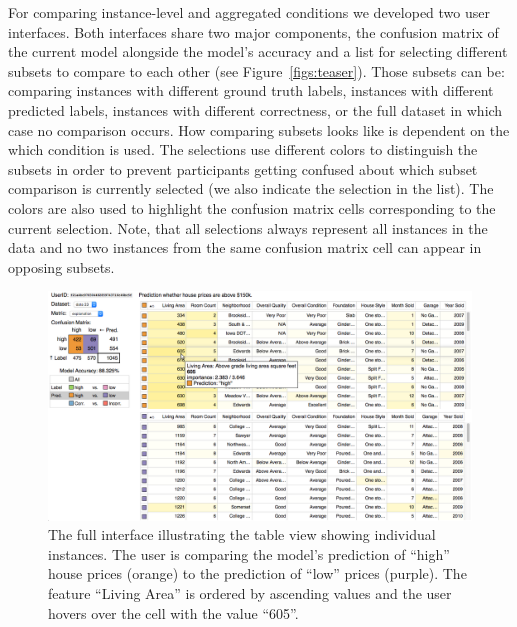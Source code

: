 For comparing instance-level and aggregated conditions we developed two user interfaces.
Both interfaces share two major components,
the confusion matrix of the current model alongside the model's accuracy and a list for selecting different subsets to compare to each other (see Figure~\ref{figs:teaser}).
Those subsets can be: comparing instances with different ground truth labels, instances with different predicted labels, instances with different correctness, or the full dataset in which case no comparison occurs.
How comparing subsets looks like is dependent on the which condition is used.
The selections use different colors to distinguish the subsets in order to prevent participants getting confused about which subset comparison is currently selected (we also indicate the selection in the list).
The colors are also used to highlight the confusion matrix cells corresponding to the current selection.
Note, that all selections always represent all instances in the data and no two instances from the same confusion matrix cell can appear in opposing subsets.

\begin{figure}
\centering
\includegraphics[width=\linewidth]{aggexplain/full_table_expl}
\caption[The full interface illustrating the table view.]{
The full interface illustrating the table view showing individual instances.
The user is comparing the model's prediction of ``high'' house prices (orange) to the prediction of ``low'' prices (purple).
The feature ``Living Area'' is ordered by ascending values and the user hovers over the cell with the value ``605''.
}
\label{figs:full_view}
\end{figure}

